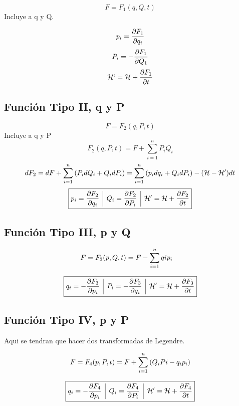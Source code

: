 \documentclass[12pt]{article}
\renewcommand{\H}{\mathcal{H}}
\newcommand{\en}[1]{\[\boxed{#1}\]}
\newcommand{\mc}[1]{\mathcal{#1}}
\newcommand{\sumn}[1]{\sum_{#1 =1}^{n}}
\renewcommand{\ss}[1]{\subsection{#1}}
\newcommand{\vl}{\,\,\, \vline \,\,\,}
\begin{document}
$$F= F_1 (q,Q,t)$$
Incluye a q y Q.

$$p_i = \pdv{F_1}{q_i}$$
$$P_i= - \pdv{F_1}{Q_1}$$
$$\mc{H}`= \mc{H} + \pdv{F_1}{t}$$
\ss{Función Tipo II, q y P}
$$F= F_2(q,P,t)$$
Incluye a q y P
$$F_2(q,P,t)= F+\sumn{i}P_iQ_i$$
\begin{align}
dF_2 &= dF + \sumn{i} \qty(P_i dQ_i + Q_i dP_i)=\sumn{i}\qty(p_i dq_i + Q_i dP_i)- \qty(\H -\H')dt\\
\end{align}
\en{p_i= \pdv{F_2}{q_i} \vl Q_i=\pdv{F_2}{P_i} \vl \H' = \H + \pdv{F_2}{t}}

\ss{Función Tipo III, p y Q}
\begin{align}
&F= F_3\qty(p,Q,t)= F - \sumn{i} qip_i
\end{align}

\en{q_i= -\pdv{F_3}{p_i} \vl P_i=-\pdv{F_3}{q_i} \vl \H' = \H + \pdv{F_3}{t}}

\ss{Función Tipo IV, p y P}
Aqui se tendran que hacer dos transformadas de Legendre.

\begin{align}
F= F_4 \qty(p,P,t)= F + \sumn{i}\qty(Q_iPi-q_i p_i)
\end{align}

\en{q_i= -\pdv{F_4}{p_i} \vl Q_i=\pdv{F_4}{P_i} \vl \H' = \H + \pdv{F_4}{t}}
\end{document}
